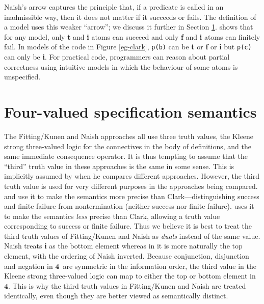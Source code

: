 \documentclass{tlp}
\newcommand{\Quad}{\ensuremath{\mathbf{4}}}
\begin{document}
\vspace*{0.6em}\noindent
Naish's arrow captures the principle that, 
if a predicate is called in an inadmissible way, 
then it does not matter if it succeeds or fails.  
The definition of
a model uses this weaker ``arrow''; we discuss it further in Section
\ref{sec-generalised}.   shows that for any model,
only \textbf{t} and \textbf{i} atoms can succeed and only \textbf{f}
and \textbf{i} atoms can finitely fail.  In models of the code in
Figure \ref{eg-clark}, \texttt{p(b)} can be \textbf{t} or \textbf{f}
or \textbf{i} but \texttt{p(c)} can only be \textbf{i}.  For practical
code, programmers can reason about partial correctness using intuitive
models in which the behaviour of some atoms is unspecified.



\section{Four-valued specification semantics}
\label{sec-generalised}


The Fitting/Kunen and Naish approaches all use three truth values,
the Kleene strong three-valued logic for the connectives in the body of
definitions, and the same immediate consequence operator.  It is thus
tempting to assume that the ``third'' truth value in these approaches
is the same in some sense.  This is implicitly assumed by 
when he compares different approaches.
However, the third truth value is used for very different purposes in
the approaches being compared.  
 and  use it to make the semantics 
more precise than Clark---distinguishing success and finite failure 
from nontermination (neither success nor finite failure).  
 uses it to make the semantics
\emph{less} precise than Clark, allowing a truth value corresponding
to success or finite failure.  Thus we believe it is best to treat the
third truth values of Fitting/Kunen and Naish as \emph{duals} instead 
of the same value. Naish treats \textbf{i} as the bottom element
whereas in  it is more naturally the top element, with the
ordering of Naish inverted.
Because conjunction, disjunction and negation in \Quad\ are
symmetric in the information order, the third value in the Kleene strong
three-valued logic can map to either the top or bottom element in \Quad.
This is why the third truth values in Fitting/Kunen and Naish are treated
identically, even though they are better viewed as semantically distinct.
\end{document}

